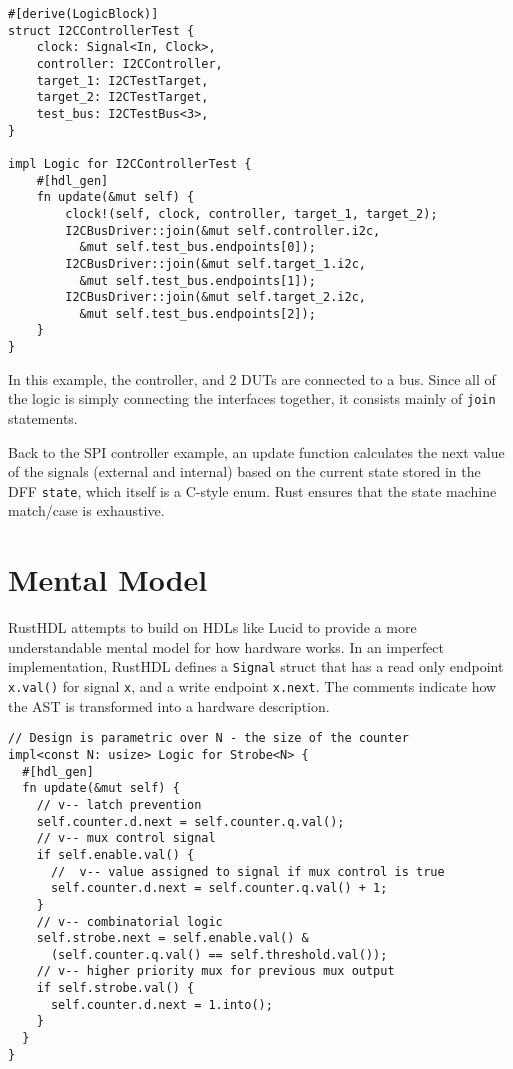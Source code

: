 \documentclass[sigplan,screen,sigconf]{acmart}
\begin{document}
\begin{verbatim}
#[derive(LogicBlock)]
struct I2CControllerTest {
    clock: Signal<In, Clock>,
    controller: I2CController,
    target_1: I2CTestTarget,
    target_2: I2CTestTarget,
    test_bus: I2CTestBus<3>,
}

impl Logic for I2CControllerTest {
    #[hdl_gen]
    fn update(&mut self) {
        clock!(self, clock, controller, target_1, target_2);
        I2CBusDriver::join(&mut self.controller.i2c, 
          &mut self.test_bus.endpoints[0]);
        I2CBusDriver::join(&mut self.target_1.i2c,
          &mut self.test_bus.endpoints[1]);
        I2CBusDriver::join(&mut self.target_2.i2c, 
          &mut self.test_bus.endpoints[2]);
    }
}
\end{verbatim}

In this example, the controller, and 2 DUTs are connected to a bus.  Since all of the logic is simply connecting the interfaces together, it consists mainly of \verb|join| statements. 

Back to the SPI controller example, an update function calculates the next value of the 
signals (external and internal) based on the current state stored in the DFF \verb|state|,
which itself is a C-style enum.  Rust ensures that the state machine match/case is exhaustive. 

\section{Mental Model}
RustHDL attempts to build on HDLs like Lucid\cite{b11} to provide a more understandable mental model for how hardware works.  In an imperfect implementation, RustHDL defines a \verb|Signal| struct that has a read only endpoint \verb|x.val()| for signal \verb|x|, and a write endpoint \verb|x.next|.    The comments indicate how the AST is transformed into a hardware description. 

\begin{verbatim}
// Design is parametric over N - the size of the counter
impl<const N: usize> Logic for Strobe<N> {
  #[hdl_gen]
  fn update(&mut self) {
    // v-- latch prevention
    self.counter.d.next = self.counter.q.val();
    // v-- mux control signal
    if self.enable.val() {
      //  v-- value assigned to signal if mux control is true
      self.counter.d.next = self.counter.q.val() + 1;
    }
    // v-- combinatorial logic
    self.strobe.next = self.enable.val() & 
      (self.counter.q.val() == self.threshold.val());
    // v-- higher priority mux for previous mux output
    if self.strobe.val() {
      self.counter.d.next = 1.into();
    }
  }
} 
\end{verbatim}
\end{document}
